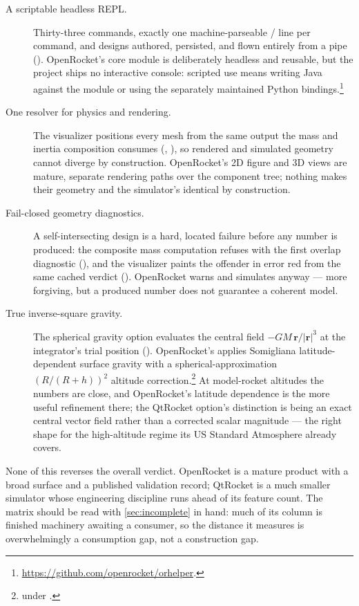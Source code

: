 \begin{description}
\item[A scriptable headless REPL.] Thirty-three commands, exactly one machine-parseable
/ line per command, and designs authored, persisted, and flown entirely from
a pipe (). OpenRocket's core module is deliberately headless and
reusable, but the project ships no interactive console: scripted use means writing Java against
the module or using the separately maintained Python
bindings.\footnote{\url{https://github.com/openrocket/orhelper}.}

\item[One resolver for physics and rendering.] The visualizer positions every mesh from the same
 output the mass and inertia composition consumes
(, ), so rendered and
simulated geometry cannot diverge by construction. OpenRocket's 2D figure and 3D views are
mature, separate rendering paths over the component tree; nothing makes their geometry and the
simulator's identical by construction.

\item[Fail-closed geometry diagnostics.] A self-intersecting design is a hard, located failure
before any number is produced: the composite mass computation refuses with the first overlap
diagnostic (), and the visualizer paints the offender in error
red from the same cached verdict (). OpenRocket warns
and simulates anyway --- more forgiving, but a produced number does not guarantee a coherent
model.

\item[True inverse-square gravity.] The spherical gravity option evaluates the central field
$-GM\,\mathbf{r}/|\mathbf{r}|^{3}$ at the integrator's trial position
(). OpenRocket's  applies
Somigliana latitude-dependent surface gravity with a spherical-approximation
$(R/(R+h))^{2}$ altitude correction.\footnote{ under
.} At model-rocket altitudes the
numbers are close, and OpenRocket's latitude dependence is the more useful refinement there; the
QtRocket option's distinction is being an exact central vector field rather than a corrected
scalar magnitude --- the right shape for the high-altitude regime its US Standard Atmosphere
already covers.
\end{description}

None of this reverses the overall verdict. OpenRocket is a mature product with a broad surface
and a published validation record; QtRocket is a much smaller simulator whose engineering
discipline runs ahead of its feature count. The matrix should be read with
\cref{sec:incomplete} in hand: much of its \fpartial{} column is finished machinery awaiting a
consumer, so the distance it measures is overwhelmingly a consumption gap, not a construction
gap.
